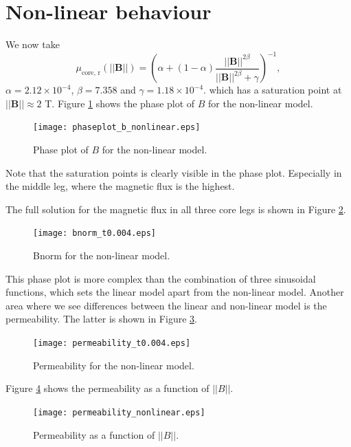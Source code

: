 \section{Non-linear behaviour}
We now take 
\begin{equation*}
\mu_{\text{core, r}}(||\textbf{B}||) = \left(\alpha + (1 - \alpha) \frac{||\textbf{B}||^{2\beta}}{||\textbf{B}||^{2\beta} + \gamma}\right)^{-1},
\end{equation*}
$\alpha = 2.12 \times 10^{-4}$, $\beta = 7.358$ and $\gamma = 1.18 \times 10^{-4}$.
which has a saturation point at $||\textbf{B}|| \approx 2$ T.
Figure \ref{fig:nonlinear_phaseplot} shows the phase plot of $B$ for the non-linear model.
\begin{figure}[t]
    \centering
    \texttt{[image: phaseplot\_b\_nonlinear.eps]}
    \caption{Phase plot of $B$ for the non-linear model.}
    \label{fig:nonlinear_phaseplot}
\end{figure}
Note that the saturation points is clearly visible in the phase plot. Especially in the middle leg, where the magnetic flux is the highest.

The full solution for the magnetic flux in all three core legs is shown in Figure \ref{fig:nonlinear_bnorm}.
\begin{figure}[t]
    \centering
    \texttt{[image: bnorm\_t0.004.eps]}
    \caption{Bnorm for the non-linear model.}
    \label{fig:nonlinear_bnorm}
\end{figure}
This phase plot is more complex than the combination of three sinusoidal functions, which sets the linear model apart from the non-linear model.
Another area where we see differences between the linear and non-linear model is the permeability. The latter is shown in Figure \ref{fig:nonlinear_permeability}.
\begin{figure}[t]
    \centering
    \texttt{[image: permeability\_t0.004.eps]}
    \caption{Permeability for the non-linear model.}
    \label{fig:nonlinear_permeability}
\end{figure}
Figure \ref{fig:nonlinear_permeability_bnorm} shows the permeability as a function of $||B||$.
\begin{figure}[t]
    \centering
    \texttt{[image: permeability\_nonlinear.eps]}
    \caption{Permeability as a function of $||B||$.}
    \label{fig:nonlinear_permeability_bnorm}
\end{figure}





